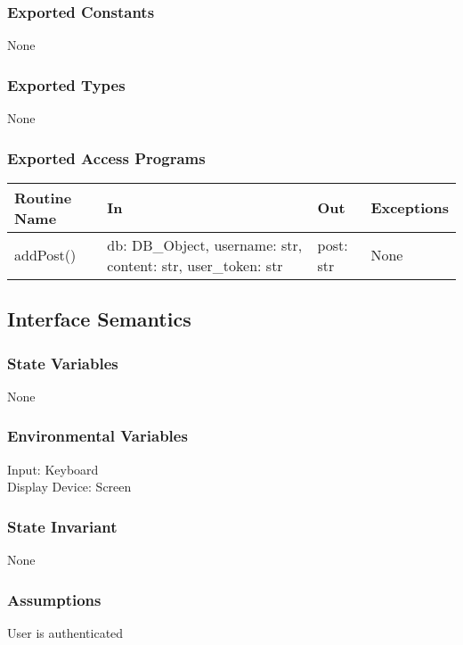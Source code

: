 \documentclass[12pt, titlepage]{article}
\begin{document}
\subsubsection* {Exported Constants}
None

\subsubsection* {Exported Types}
None

\subsubsection* {Exported Access Programs}
\begin{table}[!htb]
    \centering
    \begin{tabular}{|p{3cm}|p{3cm}|p{3cm}|p{4.5cm}|}
        \hline
        \textbf{Routine Name} & \textbf{In} & \textbf{Out} & \textbf{Exceptions} \\
        \hline
         addPost() & db: DB\_Object, username: str, content: str, user\_token: str  & post: str & None\\
        \hline
    \end{tabular}
\end{table}

\subsection{Interface Semantics}
\subsubsection{State Variables}
None
\subsubsection{Environmental Variables}
Input: Keyboard\\
Display Device: Screen

\subsubsection{State Invariant}
None

\subsubsection{Assumptions}
User is authenticated
\end{document}
